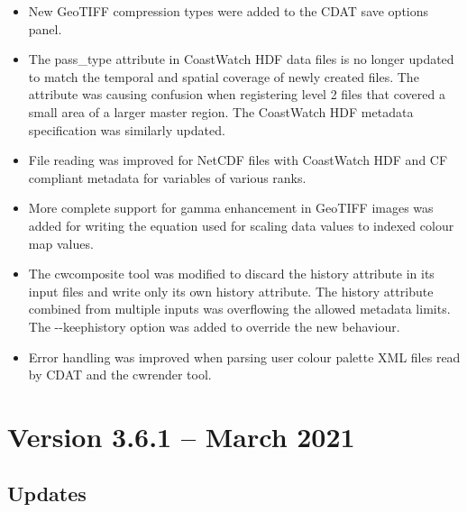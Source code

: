 \begin{itemize}
  
  \item New GeoTIFF compression types were added to the CDAT save options panel.
  
  \item The pass\_type attribute in CoastWatch HDF data files is no longer
  updated to match the temporal and spatial coverage of newly created files.
  The attribute was causing confusion when registering level 2 files that
  covered a small area of a larger master region.  The CoastWatch HDF metadata
  specification was similarly updated.
  
  \item File reading was improved for NetCDF files with CoastWatch
  HDF and CF compliant metadata for variables of various ranks.
  
  \item More complete support for gamma enhancement in GeoTIFF images was
  added for writing the equation used for scaling data values to indexed
  colour map values.
  
  \item The cwcomposite tool was modified to discard the history attribute
  in its input files and write only its own history attribute.  The history
  attribute combined from multiple inputs was overflowing the allowed
  metadata limits.  The -{-}keephistory option was added to override the
  new behaviour.
  
  \item Error handling was improved when parsing user colour palette
  XML files read by CDAT and the cwrender tool.
  
\end{itemize}


\section{Version 3.6.1 -- March 2021}

\subsection*{ Updates}

